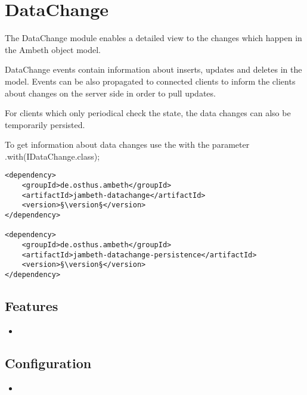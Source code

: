 \section{DataChange}
\label{module:DataChange}
\ClearAPI
\TODO
The DataChange module enables a detailed view to the changes which happen in the Ambeth object model. 

DataChange events contain information about inserts, updates and deletes in the model. Events can be also propagated to connected clients to inform the clients about changes on the server side in order to pull updates.

For clients which only periodical check the state, the data changes can also be temporarily persisted.

To get information about data changes use the  with the parameter .with(IDataChange.class);

\begin{lstlisting}[style=POM,caption={Maven modules to use \emph{Ambeth DataChange}}]
<dependency>
	<groupId>de.osthus.ambeth</groupId>
	<artifactId>jambeth-datachange</artifactId>
	<version>§\version§</version>
</dependency>

<dependency>
	<groupId>de.osthus.ambeth</groupId>
	<artifactId>jambeth-datachange-persistence</artifactId>
	<version>§\version§</version>
</dependency>
\end{lstlisting}
\subsection{Features}
\begin{itemize}
	\item {}
\end{itemize}

\subsection{Configuration}
\begin{itemize}
	\item {}
\end{itemize}
